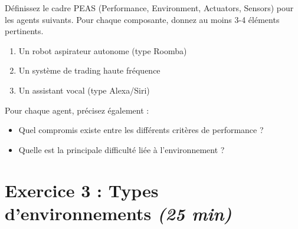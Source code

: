 \documentclass[11pt,a4paper]{article}
\begin{document}
\begin{exercicebox}[Énoncé]
Définissez le cadre PEAS (Performance, Environment, Actuators, Sensors) pour les agents suivants. Pour chaque composante, donnez au moins 3-4 éléments pertinents.

\begin{enumerate}
    \item Un robot aspirateur autonome (type Roomba)
    \item Un système de trading haute fréquence
    \item Un assistant vocal (type Alexa/Siri)
\end{enumerate}

Pour chaque agent, précisez également :
\begin{itemize}
    \item Quel compromis existe entre les différents critères de performance ?
    \item Quelle est la principale difficulté liée à l'environnement ?
\end{itemize}
\end{exercicebox}

\vspace{1cm}

\section*{Exercice 3 : Types d'environnements \hfill \textit{(25 min)}}
\end{document}
